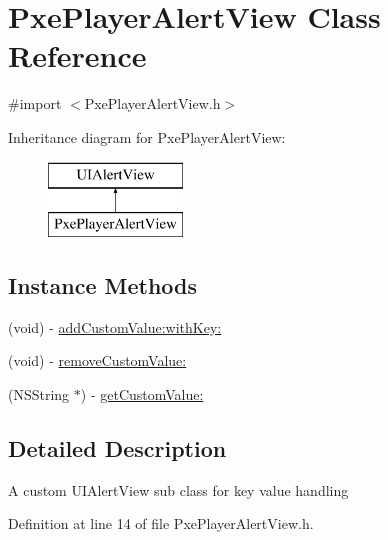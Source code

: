 \hypertarget{interface_pxe_player_alert_view}{\section{Pxe\-Player\-Alert\-View Class Reference}
\label{interface_pxe_player_alert_view}
}


{\ttfamily \#import $<$Pxe\-Player\-Alert\-View.\-h$>$}

Inheritance diagram for Pxe\-Player\-Alert\-View\-:\begin{figure}[H]
\begin{center}
\leavevmode
\includegraphics[height=2.000000cm]{interface_pxe_player_alert_view}
\end{center}
\end{figure}
\subsection*{Instance Methods}
\begin{DoxyCompactItemize}
\item 
(void) -\/ \hyperlink{interface_pxe_player_alert_view_a791feec3c06df0d7a1df9f92ee7ec83b}{add\-Custom\-Value\-:with\-Key\-:}
\item 
(void) -\/ \hyperlink{interface_pxe_player_alert_view_a56b5ad4f1e2c89604c7b4fb528d202b3}{remove\-Custom\-Value\-:}
\item 
(N\-S\-String $\ast$) -\/ \hyperlink{interface_pxe_player_alert_view_a49e659b5368d59df5ec5e9f22776afa8}{get\-Custom\-Value\-:}
\end{DoxyCompactItemize}


\subsection{Detailed Description}
A custom U\-I\-Alert\-View sub class for key value handling 

Definition at line 14 of file Pxe\-Player\-Alert\-View.\-h.



